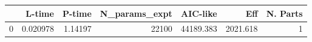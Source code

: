 \begin{tabular}{lrrrrrr}
\toprule
{} &    L-time &   P-time &  N\_params\_expt &   AIC-like &       Eff &  N. Parts \\
\midrule
0 &  0.020978 &  1.14197 &          22100 &  44189.383 &  2021.618 &         1 \\
\bottomrule
\end{tabular}

